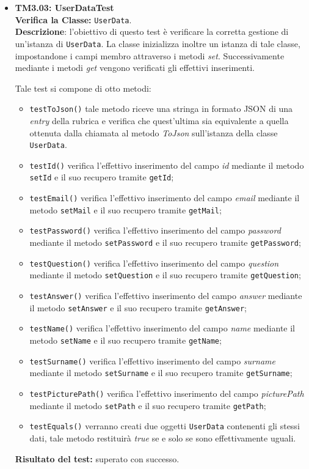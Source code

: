 \begin{itemize}
\item \textbf{TM3.03: UserDataTest}\\
\textbf{Verifica la Classe:} \texttt{UserData}.\\
\textbf{Descrizione}: l'obiettivo di questo test è verificare la corretta gestione di un'istanza di \texttt{UserData}. La classe inizializza inoltre un istanza di tale classe, impostandone i campi membro attraverso i metodi \textit{set}. Successivamente mediante i metodi \textit{get} vengono verificati gli effettivi inserimenti.

Tale test si compone di otto metodi:
\begin{itemize}
\item \texttt{testToJson()} tale metodo riceve una stringa in formato JSON di una \textit{entry} della rubrica e verifica che quest'ultima sia equivalente a quella ottenuta dalla chiamata al metodo \textit{ToJson} sull'istanza della classe \texttt{UserData}.
\item \texttt{testId()} verifica l'effettivo inserimento del campo \textit{id} mediante il metodo \texttt{setId} e il suo recupero tramite \texttt{getId};
\item \texttt{testEmail()} verifica l'effettivo inserimento del campo \textit{email} mediante il metodo \texttt{setMail} e il suo recupero tramite \texttt{getMail};
\item \texttt{testPassword()} verifica l'effettivo inserimento del campo \textit{password} mediante il metodo \texttt{setPassword} e il suo recupero tramite \texttt{getPassword};
\item \texttt{testQuestion()} verifica l'effettivo inserimento del campo \textit{question} mediante il metodo \texttt{setQuestion} e il suo recupero tramite \texttt{getQuestion};
\item \texttt{testAnswer()} verifica l'effettivo inserimento del campo \textit{answer} mediante il metodo \texttt{setAnswer} e il suo recupero tramite \texttt{getAnswer};
\item \texttt{testName()} verifica l'effettivo inserimento del campo \textit{name} mediante il metodo \texttt{setName} e il suo recupero tramite \texttt{getName};
\item \texttt{testSurname()} verifica l'effettivo inserimento del campo \textit{surname} mediante il metodo \texttt{setSurname} e il suo recupero tramite \texttt{getSurname};
\item \texttt{testPicturePath()} verifica l'effettivo inserimento del campo \textit{picturePath} mediante il metodo \texttt{setPath} e il suo recupero tramite \texttt{getPath};
\item \texttt{testEquals()} verranno creati due oggetti \texttt{UserData} contenenti gli stessi dati, tale metodo restituirà \textit{true} se e solo se sono effettivamente uguali.
\end{itemize}
\textbf{Risultato del test:} superato con successo.
\end{itemize}

